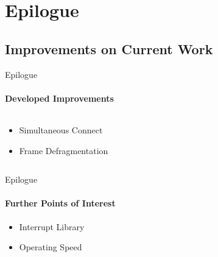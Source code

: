 \section{Epilogue}
    \subsection{Improvements on Current Work}
        \begin{frame}[t]{Epilogue}\framesubtitle{Developed Improvements}
            \begin{columns}[T]
                \begin{column}{0.48\textwidth}
                    \begin{itemize}
                        \item Simultaneous Connect
                        \item Frame Defragmentation
                    \end{itemize}
                \end{column}
                \begin{column}{.48\textwidth}
                    \begin{figure}
                    \end{figure}
                \end{column}
            \end{columns}
        \end{frame}
        \begin{frame}[t]{Epilogue}\framesubtitle{Further Points of Interest}
            \begin{itemize}
                \item Interrupt Library
                \item Operating Speed
            \end{itemize}
        \end{frame}

